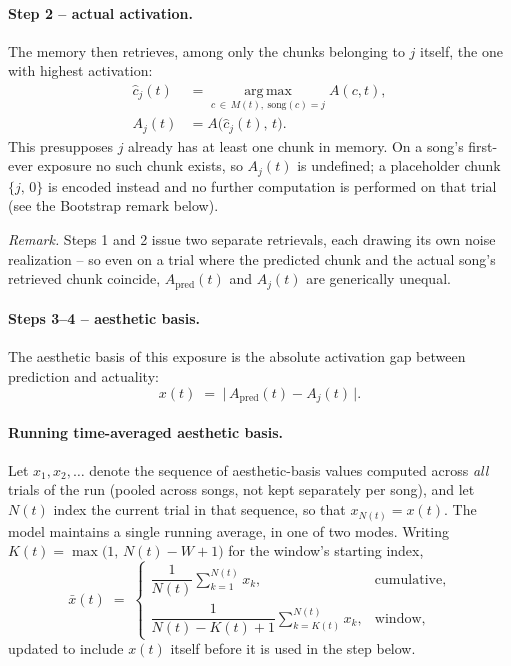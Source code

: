 \documentclass[letterpaper]{article} %
\begin{document}
\paragraph{Step 2 -- actual activation.}
The memory then retrieves, among only the chunks belonging to $j$ itself, the
one with highest activation:
\begin{align*}
\hat c_j(t) &= \operatorname*{arg\,max}_{c \,\in\, M(t),\ \mathrm{song}(c) = j} A(c,t), \\
A_j(t) &= A\bigl(\hat c_j(t),\, t\bigr).
\end{align*}
This presupposes $j$ already has at least one chunk in memory. On a song's
first-ever exposure no such chunk exists, so $A_j(t)$ is undefined; a
placeholder chunk $\{j,\,0\}$ is encoded instead and no further computation is
performed on that trial (see the Bootstrap remark below).

\emph{Remark.} Steps 1 and 2 issue two separate retrievals, each drawing its
own noise realization -- so even on a trial where the predicted chunk and the
actual song's retrieved chunk coincide, $A_{\mathrm{pred}}(t)$ and $A_j(t)$ are
generically unequal.

\paragraph{Steps 3--4 -- aesthetic basis.}
The aesthetic basis of this exposure is the absolute activation gap between
prediction and actuality:
\[
x(t) \;=\; \bigl|\, A_{\mathrm{pred}}(t) - A_j(t) \,\bigr|.
\]

\paragraph{Running time-averaged aesthetic basis.}
Let $x_1, x_2, \ldots$ denote the sequence of aesthetic-basis values computed
across \emph{all} trials of the run (pooled across songs, not kept separately
per song), and let $N(t)$ index the current trial in that sequence, so that
$x_{N(t)} = x(t)$. The model maintains a single running average, in one of two
modes. Writing $K(t) = \max\bigl(1,\, N(t)-W+1\bigr)$ for the window's
starting index,
\[
\bar x(t) \;=\;
\begin{cases}
\dfrac{1}{N(t)} \displaystyle\sum_{k=1}^{N(t)} x_k, & \text{cumulative}, \\[2.2ex]
\dfrac{1}{N(t)-K(t)+1} \displaystyle\sum_{k=K(t)}^{N(t)} x_k, & \text{window},
\end{cases}
\]
updated to include $x(t)$ itself before it is used in the step below. 
\end{document}
